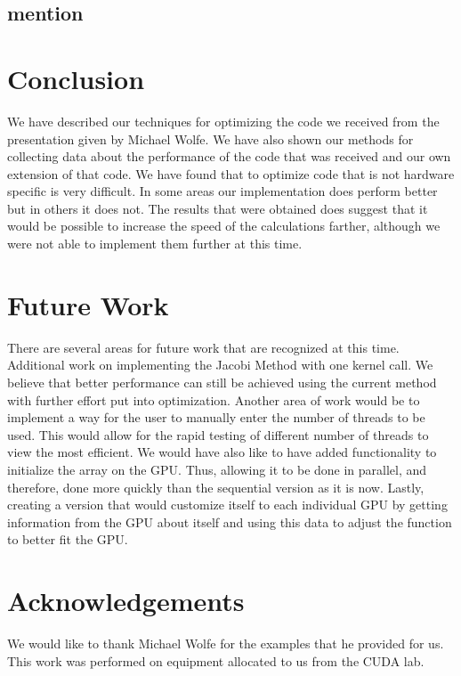 \documentclass[10pt]{article}
\begin{document}
\begin{multicols}{2}
    \subsection{mention} %

\section{Conclusion} %
We have described our techniques for optimizing the code we received from the presentation given by Michael Wolfe.
We have also shown our methods for collecting data about the performance of the code that was received and our own extension of that code.
We have found that to optimize code that is not hardware specific is very difficult.
In some areas our implementation does perform better but in others it does not.
The results that were obtained does suggest that it would be possible to increase the speed of the calculations farther, although we were not able to implement them further at this time.

\section{Future Work} %
There are several areas for future work that are recognized at this time.
Additional work on implementing the Jacobi Method with one kernel call.
We believe that better performance can still be achieved using the current method with further effort put into optimization.
Another area of work would be to implement a way for the user to manually enter the number of threads to be used.
This would allow for the rapid testing of different number of threads to view the most efficient.
We would have also like to have added functionality to initialize the array on the GPU.
Thus, allowing it to be done in parallel, and therefore, done more quickly than the sequential version as it is now.
Lastly, creating a version that would customize itself to each individual GPU by getting information from the GPU about itself and using this data to adjust the function to better fit the GPU.

\section{Acknowledgements} %
We would like to thank Michael Wolfe for the examples that he provided for us.
This work was performed on equipment allocated to us from the CUDA lab.

\end{multicols}
\end{document}
